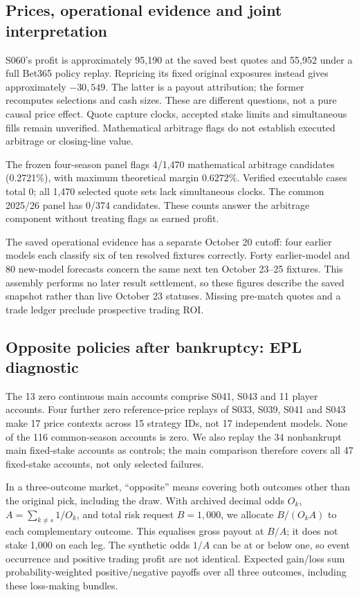 \documentclass[11pt,letterpaper]{article}
\begin{document}
\subsection{Prices, operational evidence and joint interpretation}
S060's profit is approximately 95,190 at the saved best quotes and 55,952
under a full Bet365 policy replay. Repricing its fixed original exposures
instead gives approximately $-30,549$. The latter is a payout attribution;
the former recomputes selections and cash sizes. These are different questions,
not a pure causal price effect. Quote capture clocks, accepted stake limits
and simultaneous fills remain unverified. Mathematical arbitrage flags do
not establish executed arbitrage or closing-line value.

The frozen four-season panel flags 4/1,470 mathematical arbitrage candidates (0.2721\%), with maximum theoretical margin 0.6272\%. Verified executable cases total 0; all 1,470 selected quote sets lack simultaneous clocks. The common 2025/26 panel has 0/374 candidates. These counts answer the arbitrage component without treating flags as earned profit.


The saved operational evidence has a separate October 20 cutoff: four earlier
models each classify six of ten resolved fixtures correctly. Forty earlier-model
and 80 new-model forecasts concern the same next ten October 23--25 fixtures.
This assembly performs no later result settlement, so these figures describe
the saved snapshot rather than live October 23 statuses. Missing pre-match
quotes and a trade ledger preclude prospective trading ROI.


\subsection{Opposite policies after bankruptcy: EPL diagnostic}
The 13 zero continuous main accounts comprise S041, S043 and 11 player
accounts. Four further zero reference-price replays of S033, S039, S041 and
S043 make 17 price contexts across 15 strategy IDs, not 17 independent
models. None of the 116 common-season accounts is zero. We also replay the
34 nonbankrupt main fixed-stake accounts as controls; the main comparison
therefore covers all 47 fixed-stake accounts, not only selected failures.

In a three-outcome market, ``opposite'' means covering both outcomes other
than the original pick, including the draw. With archived decimal odds
$O_k$, $A=\sum_{k\ne s}1/O_k$, and total risk request $B=1,000$, we allocate
$B/(O_kA)$ to each complementary outcome. This equalises gross payout at
$B/A$; it does not stake 1,000 on each leg. The synthetic odds $1/A$ can be
at or below one, so event occurrence and positive trading profit are not
identical. Expected gain/loss sum probability-weighted positive/negative
payoffs over all three outcomes, including these loss-making bundles.
\end{document}
